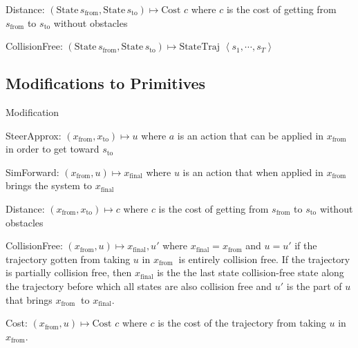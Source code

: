 \documentclass[letterpaper, 10pt, english, conference]{IEEEtran}
\begin{document}
Distance: $\left(\mbox{State}\, s_{\mbox{from}},\mbox{State}\, s_{\mbox{to}}\right)\mapsto\mbox{Cost }c$
where $c$ is the cost of getting from $s_{\mbox{from}}$ to $s_{\mbox{to}}$
without obstacles

CollisionFree: $\left(\mbox{State}\, s_{\mbox{from}},\mbox{State}\, s_{\mbox{to}}\right)\mapsto\mbox{StateTraj }\left\langle s_{1},\cdots,s_{T}\right\rangle $


\subsection{Modifications to Primitives}

Modification

SteerApprox: $ $$\left(x_{\mbox{from}},x_{\mbox{to}}\right)\mapsto u$
where $a$ is an action that can be applied in $x_{\mbox{from}}$
in order to get toward $s_{\mbox{to}}$

SimForward: $ $$\left(x_{\mbox{from}},u\right)\mapsto x_{\mbox{final}}$
where $u$ is an action that when applied in $x_{\mbox{from}}$ brings
the system to $x_{\mbox{final}}$

Distance: $\left(x_{\mbox{from}},x_{\mbox{to}}\right)\mapsto c$ where
$c$ is the cost of getting from $s_{\mbox{from}}$ to $s_{\mbox{to}}$
without obstacles

\begin{comment}
CollisionFree: $\left(x_{\mbox{from}},u\right)\mapsto\left\langle x_{1},\cdots,x_{T}\right\rangle ,\left\langle u_{0},\cdots,u_{T-1}\right\rangle $
where $ $$\left\langle x_{1},\cdots,x_{T}\right\rangle $ is a trajectory
of states arising from taking $u$ from $x_{\mbox{from}}$ until hitting
an obstacle or completing the action and $\left\langle u_{0},\cdots,u_{T-1}\right\rangle $
is a decomposition of $u$ that corresponds to the state trajectory. 
\end{comment}


CollisionFree: $\left(x_{\mbox{from}},u\right)\mapsto x_{\mbox{final}},u'$
where $x_{\mbox{final}}=x_{\mbox{from}}$ and $u=u'$ if the trajectory
gotten from taking $u$ in $x_{\mbox{from }}$ is entirely collision
free. If the trajectory is partially collision free, then $x_{\mbox{final}}$
is the the last state collision-free state along the trajectory before
which all states are also collision free and $u'$ is the part of
$u$ that brings $x_{\mbox{from }}$ to $x_{\mbox{final}}$.

Cost: $\left(x_{\mbox{from}},u\right)\mapsto\mbox{Cost }c$ where
$c$ is the cost of the trajectory from taking $u$ in $x_{\mbox{from}}$.
\end{document}
